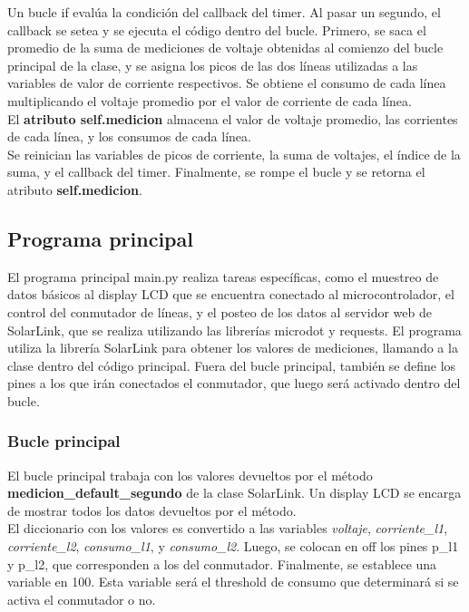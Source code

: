 Un bucle if evalúa la condición del callback del timer. Al pasar un segundo, el callback se setea y se ejecuta el código dentro del bucle. Primero, se saca el promedio de la suma de mediciones de voltaje obtenidas al comienzo del bucle principal de la clase, y se asigna los picos de las dos líneas utilizadas a las variables de valor de corriente respectivos. Se obtiene el consumo de cada línea multiplicando el voltaje promedio por el valor de corriente de cada línea.\\

El \textbf{atributo self.medicion} almacena el valor de voltaje promedio, las corrientes de cada línea, y los consumos de cada línea.\\

Se reinician las variables de picos de corriente, la suma de voltajes, el índice de la suma, y el callback del timer. Finalmente, se rompe el bucle y se retorna el atributo \textbf{self.medicion}.


\subsection{Programa principal}

El programa principal main.py realiza tareas específicas, como el muestreo de datos básicos al display LCD que se encuentra conectado al microcontrolador, el control del conmutador de líneas, y el posteo de los datos al servidor web de SolarLink, que se realiza utilizando las librerías microdot y requests. El programa utiliza la librería SolarLink para obtener los valores de mediciones, llamando a la clase dentro del código principal. Fuera del bucle principal, también se define los pines a los que irán conectados el conmutador, que luego será activado dentro del bucle.

\subsubsection{Bucle principal}

El bucle principal trabaja con los valores devueltos por el método \textbf{medicion\_default\_segundo} de la clase SolarLink. Un display LCD se encarga de mostrar todos los datos devueltos por el método.\\

El diccionario con los valores es convertido a las variables \textit{voltaje}, \textit{corriente\_l1}, \textit{corriente\_l2}, \textit{consumo\_l1}, y \textit{consumo\_l2}. Luego, se colocan en off los pines p\_l1 y p\_l2, que corresponden a los del conmutador. Finalmente, se establece una variable en 100. Esta variable será el threshold de consumo que determinará si se activa el conmutador o no.\\

